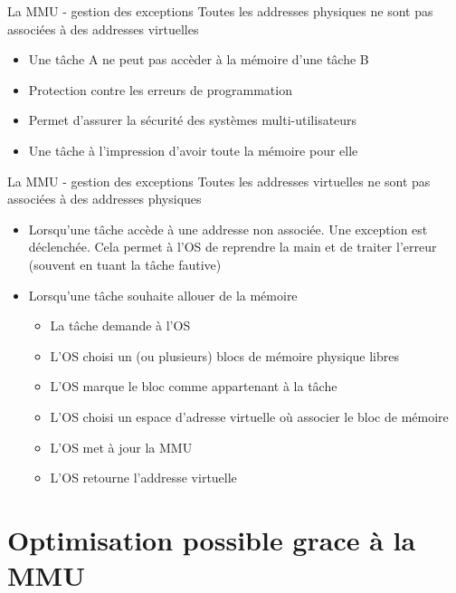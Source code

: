 \begin{frame}{La MMU - gestion des exceptions}
  Toutes les addresses physiques ne sont pas associées à des addresses
  virtuelles
  \begin{itemize} 
  \item Une tâche A ne peut pas accèder à la mémoire d'une tâche B
  \item Protection contre les erreurs de programmation
  \item Permet d'assurer la sécurité des systèmes multi-utilisateurs
  \item Une tâche à l'impression d'avoir toute la mémoire pour elle
  \end{itemize} 
\end{frame} 

\begin{frame}{La MMU - gestion des exceptions}
  Toutes les addresses  virtuelles ne sont pas associées  à des addresses
  physiques
  \begin{itemize}
  \item  Lorsqu'une  tâche accède  à  une  addresse  non associée.   Une
    exception est déclenchée.  Cela permet  à l'OS de reprendre la main
    et de traiter l'erreur (souvent en tuant la tâche fautive)
  \item Lorsqu'une tâche souhaite allouer de la mémoire
    \begin{itemize}
    \item  La tâche demande à l'OS
    \item  L'OS choisi  un (ou  plusieurs) blocs  de  mémoire physique
      libres
    \item L'OS marque le bloc comme appartenant à la tâche
    \item  L'OS choisi un  espace d'adresse  virtuelle où  associer le
      bloc de mémoire
    \item L'OS met à jour la MMU
    \item L'OS retourne l'addresse virtuelle
    \end{itemize} 
  \end{itemize} 
\end{frame} 

\section{Optimisation possible grace à la MMU}

